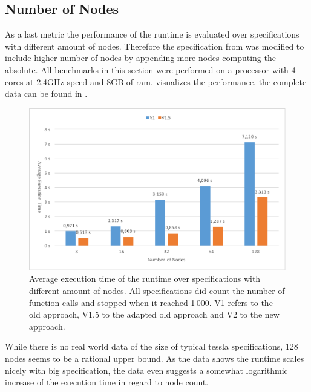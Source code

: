 \subsection{Number of Nodes}

As a last metric the performance of the runtime is evaluated over specifications with different amount of nodes.
Therefore the specification from  was modified to include higher number of nodes by appending more nodes computing the absolute.
All benchmarks in this section were performed on a processor with 4 cores at 2.4GHz speed and 8GB of \gls{ram}.
 visualizes the performance, the complete data can be found in .

\begin{figure}
  \includegraphics[width=\textwidth]{gfx/runtime_num_nodes_benchmark}
  \caption[Average execution time of the runtime over specifications with different amount of nodes.]{Average execution time of the runtime over specifications with different amount of nodes. All specifications did count the number of function calls and stopped when it reached 1\,000. V1 refers to the old approach, V1.5 to the adapted old approach and V2 to the new approach.}
\label{fig:chap_eval:runtime_num_nodes}
\end{figure}

While there is no real world data of the size of typical \gls{tessla} specifications, 128 nodes seems to be a rational upper bound.
As the data shows the runtime scales nicely with big specification, the data even suggests a somewhat logarithmic increase of the execution time in regard to node count.


